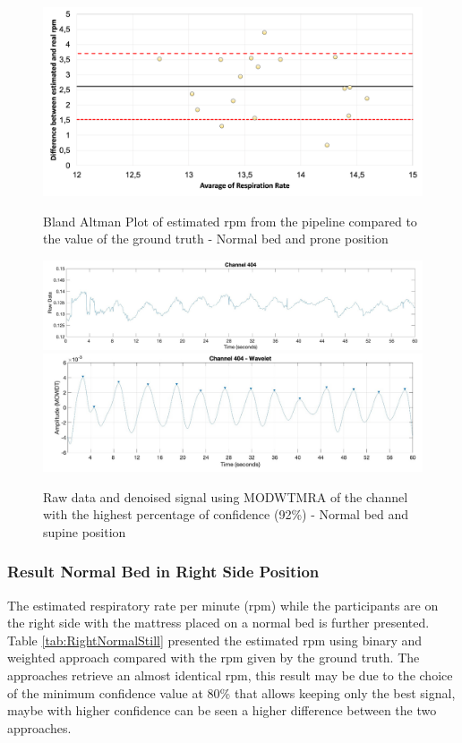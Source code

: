 \begin{figure}[p]
  \centering
  \includegraphics[width=\textwidth]{img/balnd3.png}

  \caption{Bland Altman Plot of estimated rpm from the pipeline compared to the value of the ground truth - Normal bed and prone position}
  \label{fig:baln2}
  \vspace{1.5cm}
  \includegraphics[width=\textwidth]{img/404.jpg}
  \includegraphics[width=\textwidth]{img/404_wave.jpg}
\caption{Raw data and denoised signal using MODWTMRA of the channel with the highest percentage of confidence (92\%) - Normal bed and supine position}
  \label{fig:rec}
\end{figure}

\clearpage
\subsubsection{Result Normal Bed in Right Side Position}   \label{cap:ResultNormalBed4}

The estimated respiratory rate per minute (rpm) while the participants are on the right side with the mattress placed on a normal bed is further presented. Table \ref{tab:RightNormalStill} presented the estimated rpm using binary and weighted approach compared with the rpm given by the ground truth. The approaches retrieve an almost identical rpm, this result may be due to the choice of the minimum confidence value at 80\% that allows keeping only the best signal, maybe with higher confidence can be seen a higher difference between the two approaches. 

